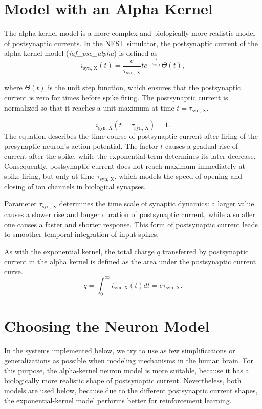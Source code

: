 \documentclass[a4paper,12pt,openright]{book}
\begin{document}
\section{Model with an Alpha Kernel}
The alpha-kernel model is a more complex and biologically more realistic model of postsynaptic currents. In the NEST simulator, the postsynaptic current of the
alpha-kernel model (\textit{iaf\_psc\_alpha}) is defined as
\[
i_{\text{syn, X}}(t) = \frac{e}{\tau_{\text{syn, X}}} t e^{-\frac{t}{\tau_{\text{syn, X}}}} \Theta(t) ,
\]

where $\Theta(t)$ is the unit step function, which ensures that the postsynaptic current
is zero for times before spike firing.
The postsynaptic current is normalized so that it reaches a unit maximum at time
$t = \tau_{\text{syn, X}}$.

\[
i_{\text{syn, X}}(t = \tau_{\text{syn, X}}) = 1 .
\]
The equation describes the time course of postsynaptic current after firing of the
presynaptic neuron's action potential. The factor $t$ causes a gradual
rise of current after the spike, while the exponential term determines its later
decrease. Consequently, postsynaptic current does not reach maximum immediately at
spike firing, but only at time $\tau_{\text{syn, X}}$, which models the speed of
opening and closing of ion channels in biological synapses.

Parameter $\tau_{\text{syn, X}}$ determines the time scale of synaptic dynamics: a larger
value causes a slower rise and longer duration of postsynaptic current,
while a smaller one causes a faster and shorter response. This form of postsynaptic current leads to
smoother temporal integration of input spikes.

As with the exponential kernel, the total charge $q$ transferred by postsynaptic current in the alpha kernel is defined as the area under the postsynaptic current curve.
\[
q = \int_0^{\infty} i_{\text{syn, X}}(t) dt = e \tau_{\text{syn, X}} .
\]

\section{Choosing the Neuron Model}
\label{sec:izbira_modela}
In the systems implemented below, we try to use as few simplifications or generalizations as possible when modeling mechanisms in the human brain. For this purpose, the alpha-kernel neuron model is more suitable,
because it has a biologically more realistic shape of postsynaptic current. Nevertheless, both models are used below, because due to the different postsynaptic current shapes, the exponential-kernel model performs better for reinforcement learning.
\end{document}

